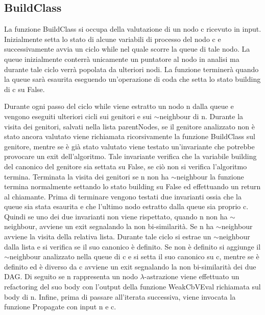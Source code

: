 \documentclass[12pt,a4paper,openright,twoside]{report}
\begin{document}
\subsection{BuildClass}
La funzione BuildClass si occupa della valutazione di un nodo c ricevuto in input. Inizialmente setta lo stato di alcune variabili di processo del nodo c e successivamente avvia un ciclo while nel quale scorre la queue di tale nodo. La queue inizialmente conterr\`a unicamente un puntatore al nodo in analisi ma durante tale ciclo verr\`a popolata da ulteriori nodi. La funzione terminer\`a quando la queue sar\`a esaurita eseguendo un'operazione di coda che setta lo stato building di c su False.\newline

Durante ogni passo del ciclo while viene estratto un nodo n dalla queue e vengono eseguiti ulteriori cicli sui genitori e sui $\sim$neighbour di n.\newline
Durante la visita dei genitori, salvati nella lista parentNodes, se il genitore analizzato non \`e stato ancora valutato viene richiamata ricorsivamente la funzione BuildClass sul genitore, mentre se \`e gi\`a stato valutato viene testato un'invariante che potrebbe provocare un exit dell'algoritmo. Tale invariante verifica che la variabile building del canonico del genitore sia settata su False, se ci\`o non si verifica l'algoritmo termina.\newline
Terminata la visita dei genitori se n non ha $\sim$neighbour la funzione termina normalmente settando lo stato building su False ed effettuando un return al chiamante. Prima di terminare vengono testati due invarianti ossia che la queue sia stata esaurita e che l'ultimo nodo estratto dalla queue sia proprio c. Quindi se uno dei due invarianti non viene rispettato, quando n non ha $\sim$neighbour, avviene un exit segnalando la non bi-similarit\`a.\newline
Se n ha $\sim$neighbour avviene la visita della relativa lista. Durante tale ciclo si estrae un $\sim$neighbour dalla lista e si verifica se il suo canonico \`e definito. Se non \`e definito si aggiunge il $\sim$neighbour analizzato nella queue di c e si setta il suo canonico su c, mentre se \`e definito ed \`e diverso da c avviene un exit segnalando la non bi-similarit\`a dei due DAG.\newline
Di seguito se n rappresenta un nodo $\lambda$-astrazione viene effettuato un refactoring del suo body con l'output della funzione WeakCbVEval richiamata sul body di n.\newline
Infine, prima di passare all'iterata successiva, viene invocata la funzione Propagate con input n e c.\newline
\end{document}
